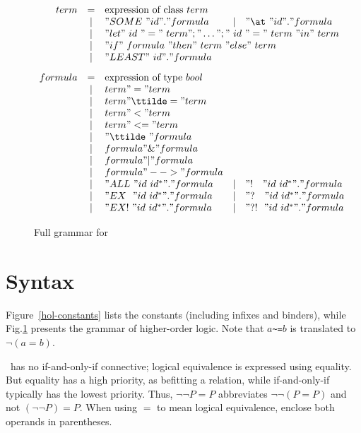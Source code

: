 \begin{figure}
\dquotes
\[\begin{array}{rclcl}
    term & = & \hbox{expression of class~$term$} \\
         & | & "SOME~" id " . " formula
         & | & "\at~" id " . " formula \\
         & | & 
    \multicolumn{3}{l}{"let"~id~"="~term";"\dots";"~id~"="~term~"in"~term} \\
         & | & 
    \multicolumn{3}{l}{"if"~formula~"then"~term~"else"~term} \\
         & | & "LEAST"~ id " . " formula \\[2ex]
 formula & = & \hbox{expression of type~$bool$} \\
         & | & term " = " term \\
         & | & term " \ttilde= " term \\
         & | & term " < " term \\
         & | & term " <= " term \\
         & | & "\ttilde\ " formula \\
         & | & formula " \& " formula \\
         & | & formula " | " formula \\
         & | & formula " --> " formula \\
         & | & "ALL~" id~id^* " . " formula
         & | & "!~~~" id~id^* " . " formula \\
         & | & "EX~~" id~id^* " . " formula 
         & | & "?~~~" id~id^* " . " formula \\
         & | & "EX!~" id~id^* " . " formula
         & | & "?!~~" id~id^* " . " formula \\
  \end{array}
\]
\caption{Full grammar for \HOL} \label{hol-grammar}
\end{figure} 


\section{Syntax}

Figure~\ref{hol-constants} lists the constants (including infixes and
binders), while Fig.\ts\ref{hol-grammar} presents the grammar of
higher-order logic.  Note that $a$\verb|~=|$b$ is translated to
$\neg(a=b)$.

\begin{warn}
  \HOL\ has no if-and-only-if connective; logical equivalence is expressed
  using equality.  But equality has a high priority, as befitting a
  relation, while if-and-only-if typically has the lowest priority.  Thus,
  $\neg\neg P=P$ abbreviates $\neg\neg (P=P)$ and not $(\neg\neg P)=P$.
  When using $=$ to mean logical equivalence, enclose both operands in
  parentheses.
\end{warn}

